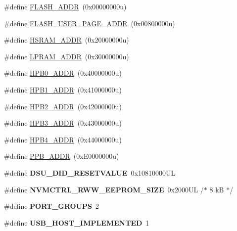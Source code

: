 \begin{DoxyCompactItemize}
\item 
\#define \hyperlink{group___s_a_m_l21_j18_a__definitions_ga485a21e55bcc66416a04d2fec83513fa}{F\+L\+A\+S\+H\+\_\+\+A\+D\+D\+R}~(0x00000000u)
\item 
\#define \hyperlink{group___s_a_m_l21_j18_a__definitions_ga263dc504b29b21d616514ac65000957e}{F\+L\+A\+S\+H\+\_\+\+U\+S\+E\+R\+\_\+\+P\+A\+G\+E\+\_\+\+A\+D\+D\+R}~(0x00800000u)
\item 
\#define \hyperlink{group___s_a_m_l21_j18_a__definitions_ga4af52d124825da5da360f11f45660723}{H\+S\+R\+A\+M\+\_\+\+A\+D\+D\+R}~(0x20000000u)
\item 
\#define \hyperlink{group___s_a_m_l21_j18_a__definitions_gafcca70ccd0ff44656cf27b68218ef780}{L\+P\+R\+A\+M\+\_\+\+A\+D\+D\+R}~(0x30000000u)
\item 
\#define \hyperlink{group___s_a_m_l21_j18_a__definitions_gaa3dc0741f009f571f4a45086601718f6}{H\+P\+B0\+\_\+\+A\+D\+D\+R}~(0x40000000u)
\item 
\#define \hyperlink{group___s_a_m_l21_j18_a__definitions_gabdae009c8fef488e4248183ffa937535}{H\+P\+B1\+\_\+\+A\+D\+D\+R}~(0x41000000u)
\item 
\#define \hyperlink{group___s_a_m_l21_j18_a__definitions_gaef42fa53ddf169a2a50be70d29f73571}{H\+P\+B2\+\_\+\+A\+D\+D\+R}~(0x42000000u)
\item 
\#define \hyperlink{group___s_a_m_l21_j18_a__definitions_gaf04cc27901ff4e0551572de8a92be273}{H\+P\+B3\+\_\+\+A\+D\+D\+R}~(0x43000000u)
\item 
\#define \hyperlink{group___s_a_m_l21_j18_a__definitions_ga715f8d0987dbf1b42ee8453b72b03b9f}{H\+P\+B4\+\_\+\+A\+D\+D\+R}~(0x44000000u)
\item 
\#define \hyperlink{group___s_a_m_l21_j18_a__definitions_ga8895d0a3a9a3126cc44330f86c8ce564}{P\+P\+B\+\_\+\+A\+D\+D\+R}~(0x\+E0000000u)
\item 
\hypertarget{group___s_a_m_l21_j18_a__definitions_gada75131d542c9e1966238f5488f89bd6}{}\#define {\bfseries D\+S\+U\+\_\+\+D\+I\+D\+\_\+\+R\+E\+S\+E\+T\+V\+A\+L\+U\+E}~0x10810000\+U\+L\label{group___s_a_m_l21_j18_a__definitions_gada75131d542c9e1966238f5488f89bd6}

\item 
\hypertarget{group___s_a_m_l21_j18_a__definitions_gacb7a115808eeb0b50bd55888f9ba65ae}{}\#define {\bfseries N\+V\+M\+C\+T\+R\+L\+\_\+\+R\+W\+W\+\_\+\+E\+E\+P\+R\+O\+M\+\_\+\+S\+I\+Z\+E}~0x2000\+U\+L /$\ast$ 8 k\+B $\ast$/\label{group___s_a_m_l21_j18_a__definitions_gacb7a115808eeb0b50bd55888f9ba65ae}

\item 
\hypertarget{group___s_a_m_l21_j18_a__definitions_gab9243ffe03a1dc631b57a495b4b3d467}{}\#define {\bfseries P\+O\+R\+T\+\_\+\+G\+R\+O\+U\+P\+S}~2\label{group___s_a_m_l21_j18_a__definitions_gab9243ffe03a1dc631b57a495b4b3d467}

\item 
\hypertarget{group___s_a_m_l21_j18_a__definitions_ga880f394946155d1e85a5fde38b7f825a}{}\#define {\bfseries U\+S\+B\+\_\+\+H\+O\+S\+T\+\_\+\+I\+M\+P\+L\+E\+M\+E\+N\+T\+E\+D}~1\label{group___s_a_m_l21_j18_a__definitions_ga880f394946155d1e85a5fde38b7f825a}

\end{DoxyCompactItemize}

